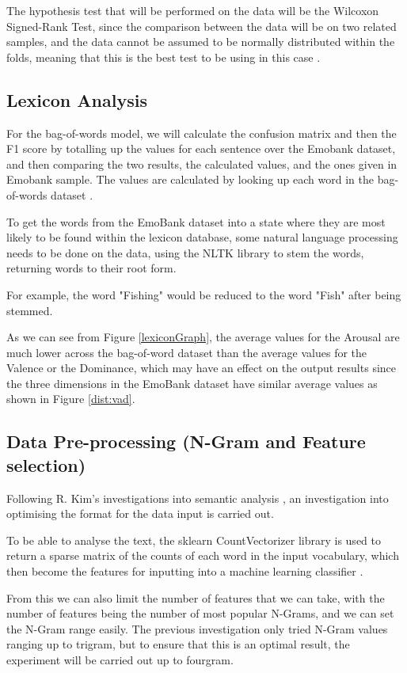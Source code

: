 The hypothesis test that will be performed on the data will be the Wilcoxon Signed-Rank Test, since the comparison between the data will be on two related samples, and the data cannot be assumed to be normally distributed within the folds, meaning that this is the best test to be using in this case \cite{wilcoxon1970critical}.

\subsection{Lexicon Analysis}

For the bag-of-words model, we will calculate the confusion matrix and then the F1 score by totalling up the values for each sentence over the Emobank dataset, and then comparing the two results, the calculated values, and the ones given in Emobank sample. The values are calculated by looking up each word in the bag-of-words dataset \cite{wordsData}.

To get the words from the EmoBank dataset into a state where they are most likely to be found within the lexicon database, some natural language processing needs to be done on the data, using the NLTK \cite{NLTKBook} library to stem the words, returning words to their root form.

For example, the word "Fishing" would be reduced to the word "Fish" after being stemmed. 

As we can see from Figure \ref{lexiconGraph}, the average values for the Arousal are much lower across the bag-of-word dataset than the average values for the Valence or the Dominance, which may have an effect on the output results since the three dimensions in the EmoBank dataset have similar average values as shown in Figure \ref{dist:vad}.


\subsection{Data Pre-processing (N-Gram and Feature selection)}

Following R. Kim's investigations into semantic analysis \cite{towardsDS}, an investigation into optimising the format for the data input is carried out. 

To be able to analyse the text, the sklearn CountVectorizer library is used to return a sparse matrix of the counts of each word in the input vocabulary, which then become the features for inputting into a machine learning classifier \cite{sklearn}.

From this we can also limit the number of features that we can take, with the number of features being the number of most popular N-Grams, and we can set the N-Gram range easily. The previous investigation only tried N-Gram values ranging up to trigram, but to ensure that this is an optimal result, the experiment will be carried out up to fourgram.

